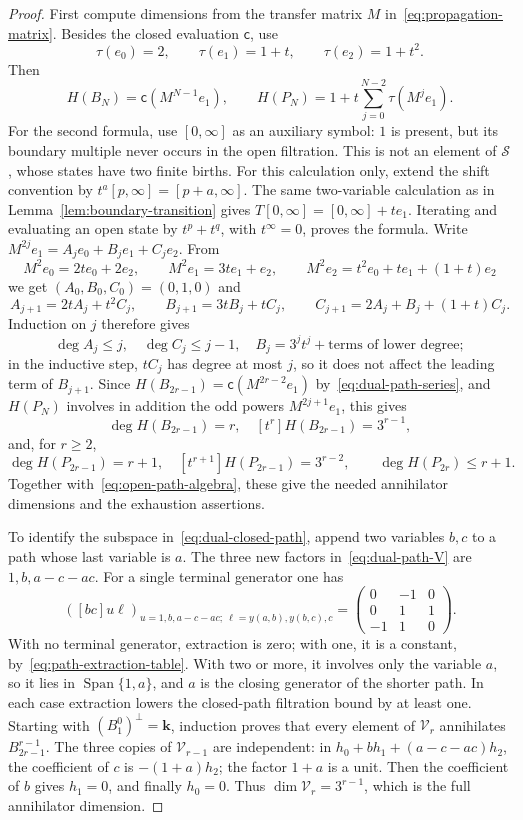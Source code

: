 \documentclass[reqno]{article}
\theoremstyle{plain} %
\theoremstyle{definition}
\theoremstyle{remark}
\DeclareMathOperator{\Span}{Span}
\newcommand{\K} {\mathbf{k}}
\numberwithin{equation}{section}
\begin{document}
\begin{proof}
First compute dimensions from the transfer matrix
$M$ in~\eqref{eq:propagation-matrix}. Besides the closed evaluation
$\mathsf c$, use
\[
\tau(e_0)=2,\qquad \tau(e_1)=1+t,\qquad \tau(e_2)=1+t^2.
\]
Then
\begin{equation}\label{eq:dual-path-series}
H(B_N)=\mathsf c(M^{N-1}e_1),\qquad
H(P_N)=1+t\sum_{j=0}^{N-2}\tau(M^je_1).
\end{equation}
For the second formula, use $[0,\infty]$ as an auxiliary symbol:
$1$ is present, but its boundary multiple never occurs in the open
filtration. This is not an element of $\mathcal S$, whose states have
two finite births. For this calculation only, extend the shift convention
by $t^a[p,\infty]=[p+a,\infty]$.
The same two-variable calculation as in
Lemma~\ref{lem:boundary-transition} gives
$T[0,\infty]=[0,\infty]+te_1$.
Iterating and evaluating an open state by $t^p+t^q$, with
$t^\infty=0$, proves the formula.
Write $M^{2j}e_1=A_je_0+B_je_1+C_je_2$. From
\[
M^2e_0=2te_0+2e_2,\qquad M^2e_1=3te_1+e_2,\qquad
M^2e_2=t^2e_0+te_1+(1+t)e_2
\]
we get $(A_0,B_0,C_0)=(0,1,0)$ and
\[
A_{j+1}=2tA_j+t^2C_j,\qquad
B_{j+1}=3tB_j+tC_j,\qquad
C_{j+1}=2A_j+B_j+(1+t)C_j.
\]
Induction on $j$ therefore gives
\[
\deg A_j\le j,\quad \deg C_j\le j-1,\quad
B_j=3^jt^j+\text{terms of lower degree};
\]
in the inductive step, $tC_j$ has degree at most $j$, so it does not
affect the leading term of $B_{j+1}$.
Since $H(B_{2r-1})=\mathsf c(M^{2r-2}e_1)$ by~\eqref{eq:dual-path-series},
and $H(P_N)$ involves in addition the odd powers $M^{2j+1}e_1$, this gives
\[
\deg H(B_{2r-1})=r,\quad [t^r]H(B_{2r-1})=3^{r-1},
\]
and, for $r\ge2$,
\[
\deg H(P_{2r-1})=r+1,\quad
[t^{r+1}]H(P_{2r-1})=3^{r-2},\qquad
\deg H(P_{2r})\le r+1.
\]
Together with~\eqref{eq:open-path-algebra}, these give the needed
annihilator dimensions and the exhaustion assertions.

To identify the subspace in~\eqref{eq:dual-closed-path}, append two
variables $b,c$ to a path whose last variable is $a$.
The three new factors in~\eqref{eq:dual-path-V} are
$1,b,a-c-ac$. For a single terminal generator one has
\begin{equation}\label{eq:path-extraction-table}
\left([bc]u\ell\right)_{
 u=1,b,a-c-ac;\ \ell=y(a,b),y(b,c),c}
 =\begin{pmatrix}0&-1&0\\0&1&1\\-1&1&0\end{pmatrix}.
\end{equation}
With no terminal generator, extraction is zero; with one, it is a
constant, by~\eqref{eq:path-extraction-table}. With two or more, it
involves only the variable $a$, so it lies in $\Span\{1,a\}$, and $a$ is
the closing generator of the shorter path. In each case extraction lowers
the closed-path filtration bound by at least one. Starting with
$(B_1^0)^\perp=\K$, induction proves that every element of $\mathcal V_r$
annihilates $B_{2r-1}^{r-1}$.
The three copies of $\mathcal V_{r-1}$ are independent: in
$h_0+bh_1+(a-c-ac)h_2$, the coefficient of $c$ is $-(1+a)h_2$;
the factor $1+a$ is a unit. Then the coefficient of $b$ gives $h_1=0$,
and finally $h_0=0$. Thus $\dim\mathcal V_r=3^{r-1}$, which is the
full annihilator dimension.


\end{proof}
\end{document}
